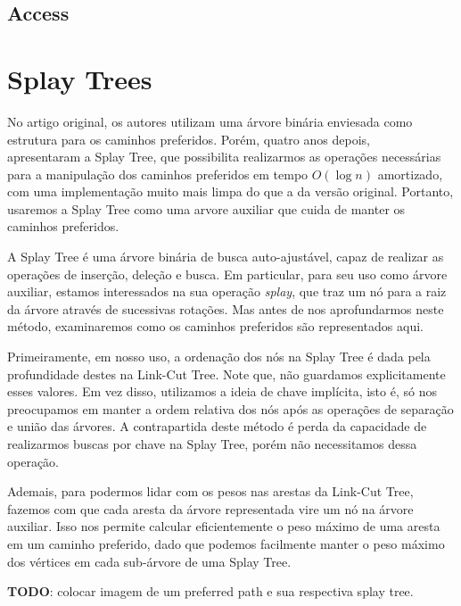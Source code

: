 \subsection{Access}
\label{subsection:lct-access}



\section{Splay Trees}
\label{sec:lct-splay-trees}

No artigo original, os autores utilizam uma árvore binária enviesada como estrutura para os caminhos preferidos. Porém, quatro anos depois, ~\citet{10.1145/3828.3835} apresentaram a Splay Tree, que possibilita realizarmos as operações necessárias para a manipulação dos caminhos preferidos em tempo $O(\log n)$ amortizado, com uma implementação muito mais limpa do que a da versão original. Portanto, usaremos a Splay Tree como uma arvore auxiliar que cuida de manter os caminhos preferidos.

A Splay Tree é uma árvore binária de busca auto-ajustável, capaz de realizar as operações de inserção, deleção e busca. Em particular, para seu uso como árvore auxiliar, estamos interessados na sua operação \emph{splay}, que traz um nó para a raiz da árvore através de sucessivas rotações. Mas antes de nos aprofundarmos neste método, examinaremos como os caminhos preferidos são representados aqui.

Primeiramente, em nosso uso, a ordenação dos nós na Splay Tree é dada pela profundidade destes na Link-Cut Tree. Note que, não guardamos explicitamente esses valores. Em vez disso, utilizamos a ideia de chave implícita, isto é, só nos preocupamos em manter a ordem relativa dos nós após as operações de separação e união das árvores. A contrapartida deste método é perda da capacidade de realizarmos buscas por chave na Splay Tree, porém não necessitamos dessa operação.

Ademais, para podermos lidar com os pesos nas arestas da Link-Cut Tree, fazemos com que cada aresta da árvore representada vire um nó na árvore auxiliar. Isso nos permite calcular eficientemente o peso máximo de uma aresta em um caminho preferido, dado que podemos facilmente manter o peso máximo dos vértices em cada sub-árvore de uma Splay Tree.

\begin{center}
    \textbf{TODO}: colocar imagem de um preferred path e sua respectiva splay tree.
\end{center}

